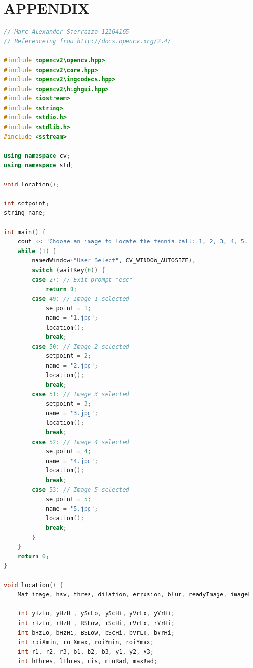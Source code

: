 \documentclass[a4paper, 10pt]{article}
\begin{document}

\nocite{*}




\clearpage
\section*{APPENDIX}

\begin{lstlisting}[language = C++]
// Marc Alexander Sferrazza 12164165
// Referenceing from http://docs.opencv.org/2.4/

#include <opencv2\opencv.hpp>
#include <opencv2\core.hpp>
#include <opencv2\imgcodecs.hpp>
#include <opencv2\highgui.hpp>
#include <iostream>
#include <string>
#include <stdio.h>
#include <stdlib.h>
#include <sstream>

using namespace cv;
using namespace std;

void location();

int setpoint;
string name;

int main() {
	cout << "Choose an image to locate the tennis ball: 1, 2, 3, 4, 5...\n\npress esc to quit\n\n-------------------------------------------------------------------------\n" << endl;
	while (1) {
		namedWindow("User Select", CV_WINDOW_AUTOSIZE);
		switch (waitKey(0)) {
		case 27: // Exit prompt "esc"
			return 0;
		case 49: // Image 1 selected
			setpoint = 1;
			name = "1.jpg";
			location();
			break;
		case 50: // Image 2 selected
			setpoint = 2;
			name = "2.jpg";
			location();
			break;
		case 51: // Image 3 selected
			setpoint = 3;
			name = "3.jpg";
			location();
			break;
		case 52: // Image 4 selected
			setpoint = 4;
			name = "4.jpg";
			location();
			break;
		case 53: // Image 5 selected
			setpoint = 5;
			name = "5.jpg";
			location();
			break;
		}
	}
	return 0;
}

void location() {
	Mat image, hsv, thres, dilation, errosion, blur, readyImage, imageFinal;
	
	int yHzLo, yHzHi, yScLo, yScHi, yVrLo, yVrHi;
	int rHzLo, rHzHi, RSLow, rScHi, rVrLo, rVrHi;
	int bHzLo, bHzHi, BSLow, bScHi, bVrLo, bVrHi;
	int roiXmin, roiXmax, roiYmin, roiYmax;
	int r1, r2, r3, b1, b2, b3, y1, y2, y3;
	int hThres, lThres, dis, minRad, maxRad;


\end{lstlisting}
\end{document}
